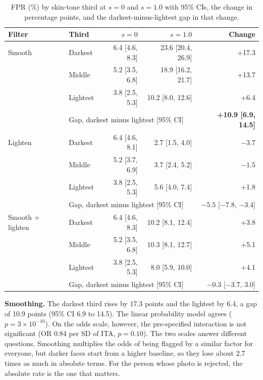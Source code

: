 \documentclass[11pt]{article}
\begin{document}
\begin{table}[h]
\centering
\caption{FPR (\%) by skin-tone third at $s=0$ and $s=1.0$ with 95\% CIs, the change in percentage points, and the darkest-minus-lightest gap in that change.}
\label{tab:tertile}
\small
\begin{tabular}{llrrr}
\toprule
Filter & Third & $s=0$ & $s=1.0$ & Change \\
\midrule
Smooth & Darkest  & 6.4 [4.6, 8.3] & 23.6 [20.4, 26.9] & +17.3 \\
       & Middle   & 5.2 [3.5, 6.8] & 18.9 [16.2, 21.7] & +13.7 \\
       & Lightest & 3.8 [2.5, 5.3] & 10.2 [8.0, 12.6]  & +6.4 \\
       & \multicolumn{3}{l}{Gap, darkest minus lightest [95\% CI]} & \textbf{+10.9 [6.9, 14.5]} \\
\midrule
Lighten & Darkest  & 6.4 [4.6, 8.1] & 2.7 [1.5, 4.0] & $-3.7$ \\
        & Middle   & 5.2 [3.7, 6.9] & 3.7 [2.4, 5.2] & $-1.5$ \\
        & Lightest & 3.8 [2.5, 5.3] & 5.6 [4.0, 7.4] & +1.8 \\
        & \multicolumn{3}{l}{Gap, darkest minus lightest [95\% CI]} & $-5.5$ [$-7.8$, $-3.4$] \\
\midrule
Smooth + lighten & Darkest  & 6.4 [4.6, 8.3] & 10.2 [8.1, 12.4] & +3.8 \\
                 & Middle   & 5.2 [3.5, 6.8] & 10.3 [8.1, 12.7] & +5.1 \\
                 & Lightest & 3.8 [2.5, 5.3] & 8.0 [5.9, 10.0]  & +4.1 \\
                 & \multicolumn{3}{l}{Gap, darkest minus lightest [95\% CI]} & $-0.3$ [$-3.7$, 3.0] \\
\bottomrule
\end{tabular}
\end{table}

\textbf{Smoothing.} The darkest third rises by 17.3 points and the lightest by 6.4, a gap of 10.9 points (95\% CI 6.9 to 14.5). The linear probability model agrees ($p=3\times10^{-10}$). On the odds scale, however, the pre-specified interaction is not significant (OR 0.84 per SD of ITA, $p=0.10$). The two scales answer different questions. Smoothing multiplies the odds of being flagged by a similar factor for everyone, but darker faces start from a higher baseline, so they lose about 2.7 times as much in absolute terms. For the person whose photo is rejected, the absolute rate is the one that matters.
\end{document}
